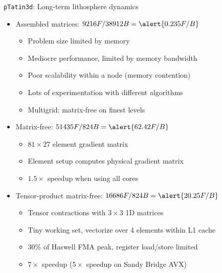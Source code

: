 \documentclass{beamer}
\begin{document}
\begin{frame}{\texttt{pTatin3d}: Long-term lithosphere dynamics}
  \begin{itemize}
  \item Assembled matrices: $9216 F/38912 B = \alert{0.235 F/B}$
    \begin{itemize}
    \item Problem size limited by memory
    \item Mediocre performance, limited by memory bandwidth
    \item Poor scalability within a node (memory contention)
    \item Lots of experimentation with different algorithms
    \item Multigrid: matrix-free on finest levels
    \end{itemize}
  \item Matrix-free: $51435 F/824 B = \alert{62.42 F/B}$
    \begin{itemize}
    \item $81\times 27$ element gradient matrix
    \item Element setup computes physical gradient matrix
    \item $1.5\times$ speedup when using all cores
    \end{itemize}
  \item Tensor-product matrix-free: $16686 F/824 B = \alert{20.25 F/B}$
    \begin{itemize}
    \item Tensor contractions with $3\times 3$ 1D matrices
    \item Tiny working set, vectorize over 4 elements within L1 cache
    \item 30\% of Haswell FMA peak, register load/store limited
    \item $7\times$ speedup ($5\times$ speedup on Sandy Bridge AVX)
    \end{itemize}
  \end{itemize}
\end{frame}


\end{document}
